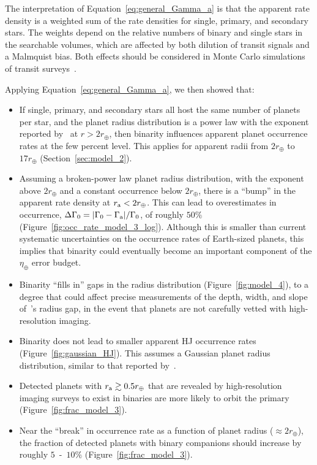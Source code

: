 \documentclass[12pt,modern]{aastex61}
\renewcommand{\a}{_{\rm a}}
\begin{document}
The interpretation of Equation~\ref{eq:general_Gamma_a} is that the
apparent rate density is a weighted sum of the rate densities for
single, primary, and secondary stars. The weights depend on the
relative numbers of binary and single stars in the searchable volumes,
which are affected by both dilution of transit signals and a Malmquist
bias.  Both effects should be considered in Monte Carlo simulations of
transit surveys~\citep[\textit{e.g.},][]{
  bakos_hatsouth:_2013,sullivan_transiting_2015, gunther_new_2017}.

Applying Equation~\ref{eq:general_Gamma_a}, we then showed that:
\begin{itemize}
%
\item If single, primary, and secondary stars all host the same number
  of planets per star, and the planet radius distribution is a power
    law with the exponent reported by~\citet{howard_planet_2012} at $r
    > 2r_\oplus$, then binarity influences apparent planet occurrence
    rates at the few percent level. This applies for apparent radii
    from $2r_\oplus$ to $17r_\oplus$ (Section~\ref{sec:model_2}).
%
\item Assuming a broken-power law planet radius distribution, with the
  \citet{howard_planet_2012} exponent above $2r_\oplus$ and a constant
    occurrence below $2r_\oplus$, there is a ``bump'' in the apparent
    rate density at $r\a < 2r_\oplus$. This can lead to
    overestimates in occurrence, $\Delta \Gamma_0 = |\Gamma_0 -
    \Gamma\a|/\Gamma_0$, of roughly $50\%$
    (Figure~\ref{fig:occ_rate_model_3_log}).  Although this is smaller
    than current systematic uncertainties on the occurrence rates of
    Earth-sized planets, this implies that binarity could eventually
    become an important component of the $\eta_\oplus$ error budget.
%
\item Binarity ``fills in'' gaps in the radius distribution
  (Figure~\ref{fig:model_4}), to a degree that could affect precise
    measurements of the depth, width, and slope
    of~\citet{fulton_california-_2017}'s radius gap, in the event that
    planets are not carefully vetted with high-resolution imaging.
%
\item Binarity does not lead to smaller apparent HJ occurrence rates
  (Figure~\ref{fig:gaussian_HJ}).  This assumes a Gaussian planet
    radius distribution, similar to that reported
    by~\citet{petigura_CKS_2017}.
%
\item Detected planets with $r\a \gtrsim 0.5r_\oplus$ that are
  revealed by high-resolution imaging surveys to exist in binaries are
    more likely to orbit the primary (Figure~\ref{fig:frac_model_3}).
%
\item Near the ``break'' in occurrence rate as a function of planet
  radius ($\approx 2r_\oplus$), the fraction of detected planets with
    binary companions should increase by roughly $5$~-~$10\%$
    (Figure~\ref{fig:frac_model_3}).
\end{itemize}
\end{document}
